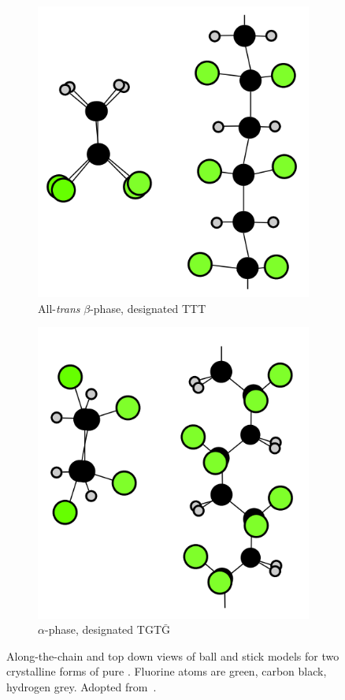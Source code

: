 \begin{figure}
\begin{subfigure}{0.5\textwidth}
\centering
	\includegraphics[width=0.8\linewidth]{./figs/chap1/pvdfbeta}
	\caption{All-\emph{trans} $\beta$-phase, designated TTT}
	\label{fig:pvdfbeta}
\end{subfigure}
\begin{subfigure}{0.5\textwidth}
\centering
	\includegraphics[width=0.8\linewidth]{./figs/chap1/pvdfalpha}
	\caption{$\alpha$-phase, designated TGT$\bar{\text{G}}$}
	\label{fig:pvdfalpha}
\end{subfigure}
\caption{Along-the-chain and top down views of ball and stick models for two crystalline forms of pure \pvdf{}. Fluorine atoms are green, carbon black, hydrogen grey. Adopted from~\cite[p. 809]{encyclopedia}.}
\label{fig:pvdfstruct}
\end{figure}
